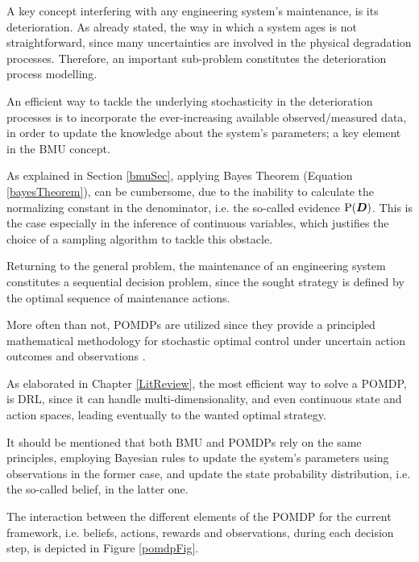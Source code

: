 \begin{myEnum}
  \item A key concept interfering with any engineering system's maintenance, is its deterioration. As already stated, the way in which a system ages is not straightforward, since many uncertainties are involved in the physical degradation processes. Therefore, an important sub-problem constitutes the deterioration process modelling. 
  \item An efficient way to tackle the underlying stochasticity in the deterioration processes is to incorporate the ever-increasing available observed/measured data, in order to update the knowledge about the system's parameters; a key element in the \gls{BMU} concept.
  \item As explained in Section \ref{bmuSec}, applying Bayes Theorem (Equation \ref{bayesTheorem}), can be cumbersome, due to the inability to calculate the normalizing constant in the denominator, i.e. the so-called evidence $\text{P}(\boldsymbol{D})$. This is the case especially in the inference of continuous variables, which justifies the choice of a sampling algorithm to tackle this obstacle.
  \item Returning to the general problem, the maintenance of an engineering system constitutes a sequential decision problem, since the sought strategy is defined by the optimal sequence of maintenance actions. 
  \item More often than not, \glspl{POMDP} are utilized since they provide a principled mathematical methodology for stochastic optimal control under uncertain action outcomes and observations \cite{morato2022optimal}.
  \item As elaborated in Chapter \ref{LitReview}, the most efficient way to solve a \gls{POMDP}, is \gls{DRL}, since it can handle multi-dimensionality, and even continuous state and action spaces, leading eventually to the wanted optimal strategy.
  \item It should be mentioned that both \gls{BMU} and \glspl{POMDP} rely on the same principles, employing Bayesian rules to update the system's parameters using observations in the former case, and update the state probability distribution, i.e. the so-called belief, in the latter one.
\end{myEnum}

The interaction between the different elements of the \gls{POMDP} for the current framework, i.e. beliefs, actions, rewards and observations, during each decision step, is depicted in Figure \ref{pomdpFig}. 

